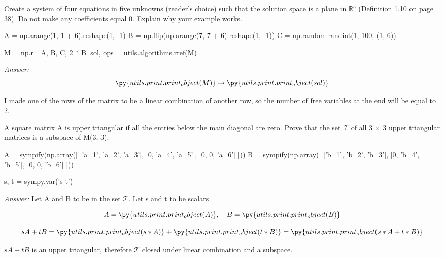 \documentclass[letterpaper]{article}
\newcommand{\ans}{\textit{Answer: }}
\newenvironment{question}[2][Question]{\begin{trivlist}
\item[\hskip \labelsep {\bfseries #1}\hskip \labelsep {\bfseries #2.}]}{\end{trivlist}}
\newcommand{\printobj}[1]{\py{utils.print.print_object(#1)}}
\begin{document}
\begin{question}{1.102}
    Create a system of four equations in five unknowns (reader’s choice) 
    such that the solution space is a plane in $\mathbb{R}^5$ (Definition 1.10 on page 38).
    Do not make any coefficients equal 0. Explain why your example works.

    \begin{pycode}
A = np.arange(1, 1 + 6).reshape(1, -1)
B = np.flip(np.arange(7, 7 + 6).reshape(1, -1))
C = np.random.randint(1, 100, (1, 6))

M = np.r_[A, B, C, 2 * B]
sol, ops = utils.algorithms.rref(M)
    \end{pycode}

    \ans 
    $$ \printobj{M} \rightarrow \printobj{sol} $$

    I made one of the rows of the matrix to be a linear combination of another row,
    so the number of free variables at the end will be equal to 2.
    
\end{question}

\begin{question}{1.119}
    A square matrix A is upper triangular if all the entries below the main 
    diagonal are zero. Prove that the set $\mathcal{T}$ of all 3 × 3 upper triangular
    matrices is a subspace of M(3, 3).

    \begin{pycode}
A = sympify(np.array([
    ['a_1', 'a_2', 'a_3'],
    [0, 'a_4', 'a_5'],
    [0, 0, 'a_6']
]))
B = sympify(np.array([
    ['b_1', 'b_2', 'b_3'],
    [0, 'b_4', 'b_5'],
    [0, 0, 'b_6']
]))

s, t = sympy.var('s t')
    \end{pycode}

    \ans Let A and B to be in the set $\mathcal{T}$. Let s and t to be scalars 

    $$A = \printobj{A}, \quad B = \printobj{B}$$

    $$sA + tB = \printobj{s * A} + \printobj{t * B} = \printobj{s * A + t * B}$$

    $sA + tB$ is an upper triangular, therefore $\mathcal{T}$ closed under 
    linear combination and a subspace. 
    
\end{question}

 
\end{document}
